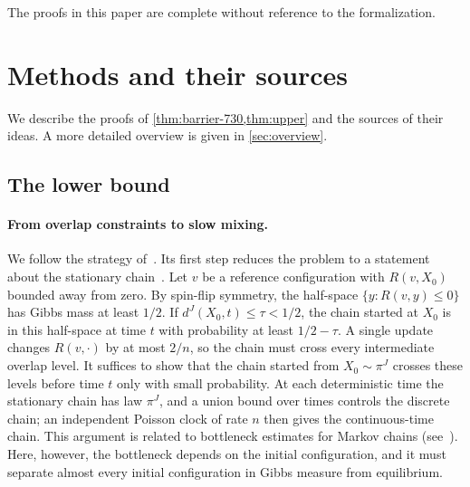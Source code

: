 \statusIntroFormal{} The proofs in this paper are complete without reference
to the formalization.

\section{Methods and their sources}\label{sec:intro-methods}

We describe the proofs of \cref{thm:barrier-730,thm:upper} and the sources
of their ideas. A more detailed overview is given in \cref{sec:overview}.

\subsection{The lower bound}

\paragraph{From overlap constraints to slow mixing.}
We follow the strategy of~\cite{oai-barriers}. Its first step reduces the
problem to a statement about the stationary
chain~\cite[Section~8.1]{oai-barriers}. Let $v$ be a reference
configuration with $R(v,X_0)$ bounded away from zero. By spin-flip symmetry,
the half-space $\{y:R(v,y)\le0\}$ has Gibbs mass at least $1/2$. If
$d^J(X_0,t)\le\tau<1/2$, the chain started at $X_0$ is in this
half-space at time $t$ with probability at least $1/2-\tau$. A single update
changes $R(v,\cdot)$ by at most $2/n$, so the chain must cross every
intermediate overlap level. It suffices to show that the chain started from
$X_0\sim\pi^J$ crosses these levels before time $t$ only with small
probability. At each deterministic time the stationary chain has law
$\pi^J$, and a union bound over times controls the discrete chain; an
independent Poisson clock of rate $n$ then gives the continuous-time chain.
This argument is related to bottleneck estimates for Markov chains
(see~\cite[Theorem~7.4]{levin-peres-2017}). Here, however, the bottleneck
depends on the initial configuration, and it must separate almost every
initial configuration in Gibbs measure from equilibrium.

